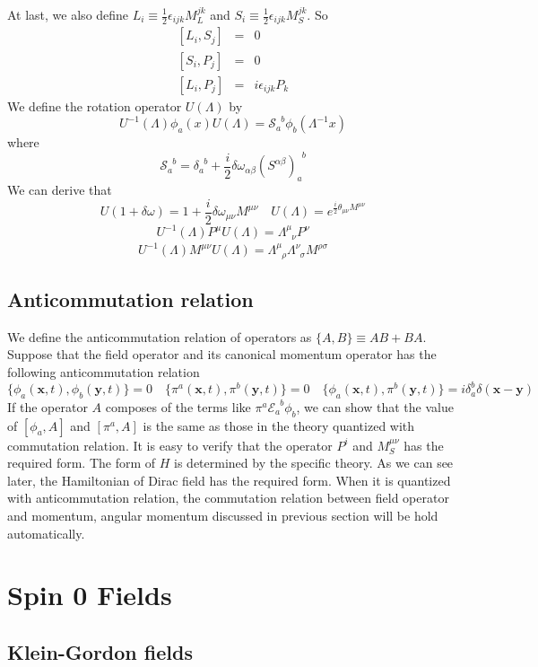 At last, we also define $L_i \equiv \frac{1}{2} \epsilon_{ijk} M_L^{jk}$ and $S_i \equiv \frac{1}{2} \epsilon_{ijk} M_S^{jk}$. So
\begin{eqnarray}
\left[L_i,S_j\right] &=& 0 \nonumber \\
\left[S_i,P_j\right] &=& 0 \nonumber \\
\left[L_i,P_j\right] &=& i\epsilon_{ijk}P_k \nonumber
\end{eqnarray}
We define the rotation operator $U(\Lambda)$ by
\[U^{-1}(\Lambda) \phi_a(x) U(\Lambda) = \mathcal{S}_{a}^{\phantom{a}b}\phi_b(\Lambda^{-1}x)\]
where
\[\mathcal{S}_{a}^{\phantom{a}b} = \delta_{a}^{\phantom{a}b}+\frac{i}{2} \delta \omega_{\alpha \beta} (S^{\alpha \beta})_{a}^{\phantom{a}b} \]
We can derive that
\[U(1+\delta \omega) = 1 + \frac{i}{2} \delta \omega_{\mu \nu} M^{\mu \nu} \quad U(\Lambda) = e^{\frac{i}{2} \theta_{\mu \nu} M^{\mu \nu}}\]
\[U^{-1}(\Lambda) P^{\mu} U(\Lambda) = \Lambda^{\mu}_{\phantom{\mu}\nu} P^{\nu}\]
\[U^{-1}(\Lambda) M^{\mu \nu} U(\Lambda) = \Lambda^{\mu}_{\phantom{\mu}\rho} \Lambda^{\nu}_{\phantom{\nu}\sigma}M^{\rho \sigma}\]

\section{Anticommutation relation}
\noindent
We define the anticommutation relation of operators as $\{A,B\} \equiv AB + BA$. Suppose that the field operator and its canonical momentum operator has the following anticommutation relation
\[\{\phi_a(\bm{x},t),\phi_b(\bm{y},t)\} = 0 \quad \{\pi^a(\bm{x},t),\pi^b(\bm{y},t)\} = 0 \quad \{\phi_a(\bm{x},t),\pi^b(\bm{y},t)\} = i \delta_a^b \delta(\bm{x}-\bm{y}) \]
If the operator $A$ composes of the terms like $\pi^a \mathcal{E}_a^{\phantom{a}b} \phi_b$, we can show that the value of $[\phi_a,A]$ and $[\pi^a,A]$ is the same as those in the theory quantized with commutation relation. It is easy to verify that the operator $P^i$ and $M_S^{\mu \nu}$ has the required form. The form of $H$ is determined by the specific theory. As we can see later, the Hamiltonian of Dirac field  has the required form. When it is quantized with anticommutation relation, the commutation relation between field operator and momentum, angular momentum discussed in previous section will be hold automatically. 

\chapter{Spin 0 Fields}
\section{Klein-Gordon fields}
